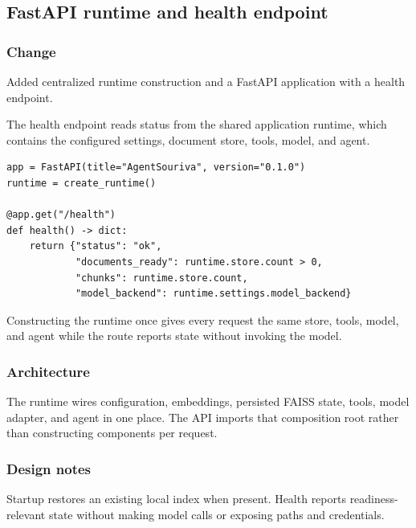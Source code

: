 
\subsection{FastAPI runtime and health endpoint}


\subsubsection{Change}

Added centralized runtime construction and a FastAPI application with a health endpoint.

The health endpoint reads status from the shared application runtime, which contains the configured settings, document store, tools, model, and agent.

\begin{verbatim}
app = FastAPI(title="AgentSouriva", version="0.1.0")
runtime = create_runtime()

@app.get("/health")
def health() -> dict:
    return {"status": "ok",
            "documents_ready": runtime.store.count > 0,
            "chunks": runtime.store.count,
            "model_backend": runtime.settings.model_backend}
\end{verbatim}

Constructing the runtime once gives every request the same store, tools, model, and agent while the route reports state without invoking the model.

\subsubsection{Architecture}

The runtime wires configuration, embeddings, persisted FAISS state, tools, model adapter, and agent in one place. The API imports that composition root rather than constructing components per request.

\subsubsection{Design notes}

Startup restores an existing local index when present. Health reports readiness-relevant state without making model calls or exposing paths and credentials.

